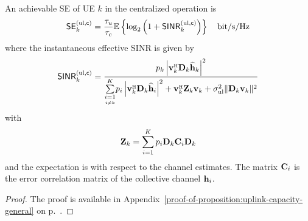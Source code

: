 \begin{theorem} \label{proposition:uplink-capacity-general}
	An achievable SE of UE $k$ in the centralized operation is
	\begin{equation} \label{eq:uplink-rate-expression-general}
	\mathsf{SE}_{k}^{({\rm ul},\mathsf{c})} = \frac{\tau_u}{\tau_c} \mathbb{E} \left\{ \log_2  \left( 1 + \mathsf{SINR}_{k}^{({\rm ul},\mathsf{c})}  \right) \right\} \quad \textrm{bit/s/Hz}
	\end{equation}
	where the instantaneous effective \gls{SINR} is given by
	\begin{equation} \label{eq:uplink-instant-SINR-level4}
	\mathacr{SINR}_{k}^{({\rm ul},\cent)} = \frac{ p_{k} \left |  \vect{v}_{k}^{\Htran} \vect{D}_{k}\widehat{\vect{h}}_{k} \right|^2  }{ 
		\condSum{i=1}{i \neq k}{K} p_{i} \left | \vect{v}_{k}^{\Htran} \vect{D}_{k}\widehat{\vect{h}}_{i} \right|^2
		+ \vect{v}_{k}^{\Htran}  {\bf{Z}}_k \vect{v}_{k}  + \sigmaUL \| \vect{D}_k \vect{v}_{k} \|^2
	}
	\end{equation}
	with
	\begin{align}
	{\bf{Z}}_k = \sum\limits_{i=1}^{K} p_{i}  \mathbf{D}_k  \mathbf{C}_{i} \mathbf{D}_k
	\end{align}
	and the expectation is with respect to the channel estimates. The matrix $\mathbf{C}_{i}$ is the error correlation matrix of the collective channel ${\mathbf{h}}_{i}$.
\end{theorem}
\begin{proof}
	The proof is available in Appendix~\ref{proof-of-proposition:uplink-capacity-general} on p.~\pageref{proof-of-proposition:uplink-capacity-general}.
\end{proof}

